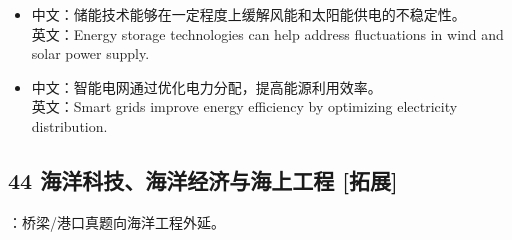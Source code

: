 \documentclass[a4paper,11pt,UTF8,fontset=none]{ctexart}
\begin{document}
\begin{itemize}[leftmargin=1.7em,itemsep=1pt,parsep=0pt,topsep=2pt]
\item \noindent 中文：储能技术能够在一定程度上缓解风能和太阳能供电的不稳定性。\\ 英文：Energy storage technologies can help address fluctuations in wind and solar power supply.\par


\item \noindent 中文：智能电网通过优化电力分配，提高能源利用效率。\\ 英文：Smart grids improve energy efficiency by optimizing electricity distribution.\par


\end{itemize}

\subsection{44 海洋科技、海洋经济与海上工程 {\color{AccentBlue} [拓展]}}

\begin{tcolorbox}[enhanced,breakable,boxrule=0.35pt,colback=VeryPaleBlue,colframe=AccentBlue!40,left=7pt,right=7pt,top=4pt,bottom=4pt,borderline west={2pt}{0pt}{AccentBlue},before skip=4pt,after skip=6pt]
：桥梁/港口真题向海洋工程外延。\par


\end{tcolorbox}
\end{document}
